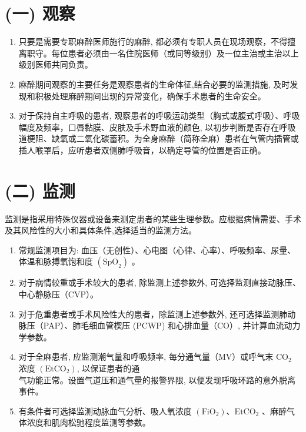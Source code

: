 \documentclass[10pt]{article}
\begin{document}
\section*{(一) 观察}
\begin{enumerate}
  \item 只要是需要专职麻醉医师施行的麻醉, 都必须有专职人员在现场观察，不得擅离职守。每位患者必须由一名住院医师（或同等级别）及一位主治或主治以上级别医师共同负责。

  \item 麻醉期间观察的主要任务是观察患者的生命体征,结合必要的监测措施, 及时发现和积极处理麻醉期间出现的异常变化，确保手术患者的生命安全。

  \item 对于保持自主呼吸的患者, 观察患者的呼吸运动类型（胸式或腹式呼吸）、呼吸幅度及频率，口唇黏膜、皮肤及手术野血液的颜色, 以初步判断是否存在呼吸道梗阻、缺氧或二氧化碳蓄积。为全身麻醉（简称全麻）患者在气管内插管或插人喉罩后，应听患者双侧肺呼吸音，以确定导管的位置是否正确。

\end{enumerate}

\section*{(二) 监测}
监测是指采用特殊仪器或设备来测定患者的某些生理参数。应根据病情需要、手术及其风险性的大小和具体条件,选择适当的监测方法。

\begin{enumerate}
  \item 常规监测项目为: 血压（无创性）、心电图（心律、心率）、呼吸频率、尿量、体温和脉搏氧饱和度 $\left(\mathrm{SpO}_{2}\right)$ 。

  \item 对于病情较重或手术较大的患者, 除监测上述参数外, 可选择监测直接动脉压、中心静脉压（CVP）。

  \item 对于危重患者或手术风险性大的患者，除监测上述参数外, 还可选择监测肺动脉压（PAP）、肺毛细血管楔压 (PCWP) 和心排血量（CO）, 并计算血流动力学参数。

  \item 对于全麻患者, 应监测潮气量和呼吸频率, 每分通气量（MV）或呼气末 $\mathrm{CO}_{2}$ 浓度 $\left(\mathrm{EtCO}_{2}\right)$, 以保证患者的通\\
气功能正常。设置气道压和通气量的报警界限, 以便发现呼吸环路的意外脱离事件。

  \item 有条件者可选择监测动脉血气分析、吸人氧浓度 $\left(\mathrm{FiO}_{2}\right) 、 \mathrm{EtCO}_{2}$ 、麻醉气体浓度和肌肉松驰程度监测等参数。

\end{enumerate}
\end{document}
